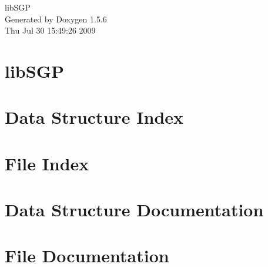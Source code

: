 \documentclass[a4paper]{book}
\begin{document}
\begin{titlepage}
\vspace*{7cm}
\begin{center}
{\Large libSGP }\\
\vspace*{1cm}
{\large Generated by Doxygen 1.5.6}\\
\vspace*{0.5cm}
{\small Thu Jul 30 15:49:26 2009}\\
\end{center}
\end{titlepage}
\clearemptydoublepage
{}
\tableofcontents
\clearemptydoublepage
{}
\chapter{libSGP}
\label{index}\hypertarget{index}{}
\chapter{Data Structure Index}

\chapter{File Index}

\chapter{Data Structure Documentation}





\chapter{File Documentation}























\printindex
\end{document}
